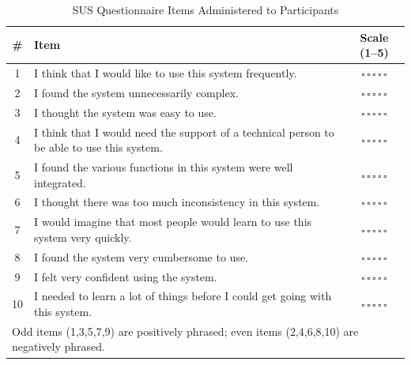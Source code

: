 \begin{table}[H]
\centering
\caption{SUS Questionnaire Items Administered to Participants}
\label{tab:sus-items}
\small
\begin{tabular}{cp{10.5cm}c}
\toprule
\textbf{\#} & \textbf{Item} & \textbf{Scale (1--5)} \\
\midrule
1  & I think that I would like to use this system frequently.                                             & $\square\,\square\,\square\,\square\,\square$ \\[2pt]
2  & I found the system unnecessarily complex.                                                            & $\square\,\square\,\square\,\square\,\square$ \\[2pt]
3  & I thought the system was easy to use.                                                                & $\square\,\square\,\square\,\square\,\square$ \\[2pt]
4  & I think that I would need the support of a technical person to be able to use this system.           & $\square\,\square\,\square\,\square\,\square$ \\[2pt]
5  & I found the various functions in this system were well integrated.                                    & $\square\,\square\,\square\,\square\,\square$ \\[2pt]
6  & I thought there was too much inconsistency in this system.                                           & $\square\,\square\,\square\,\square\,\square$ \\[2pt]
7  & I would imagine that most people would learn to use this system very quickly.                         & $\square\,\square\,\square\,\square\,\square$ \\[2pt]
8  & I found the system very cumbersome to use.                                                           & $\square\,\square\,\square\,\square\,\square$ \\[2pt]
9  & I felt very confident using the system.                                                              & $\square\,\square\,\square\,\square\,\square$ \\[2pt]
10 & I needed to learn a lot of things before I could get going with this system.                         & $\square\,\square\,\square\,\square\,\square$ \\
\bottomrule
\multicolumn{3}{l}{\footnotesize Odd items (1,3,5,7,9) are positively phrased; even items (2,4,6,8,10) are negatively phrased.}
\end{tabular}
\end{table}

